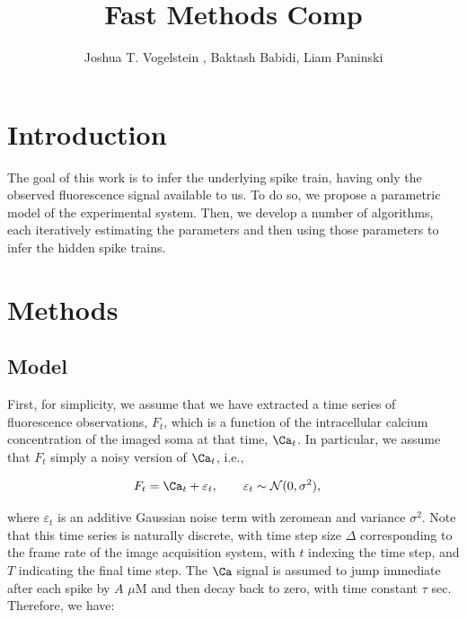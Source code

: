 \documentclass[12pt]{article}
\title{Fast Methods Comp}
\author{Joshua T. Vogelstein%
, Baktash Babidi, Liam Paninski
}
\begin{document}
\maketitle %
\tableofcontents

\begin{abstract}

\end{abstract}

\section{Introduction}

The goal of this work is to infer the underlying spike train, having only the observed fluorescence signal available to us.  To do so, we propose a parametric model of the experimental system.  Then, we develop a number of algorithms, each iteratively estimating the parameters and then using those parameters to infer the hidden spike trains.  

\section{Methods}
\subsection{Model}

First, for simplicity, we assume that we have extracted a time series of fluorescence observations, $F_t$, which is a function of the intracellular calcium concentration of the imaged soma at that time, $\Ca_t$.  In particular, we assume that $F_t$ simply a noisy version of $\Ca_t$, i.e.,

\begin{align} \label{eq:F}
F_t &=  \Ca_t + \varepsilon_t, \qquad \varepsilon_t \sim \mathcal{N}(0,\sigma^2),
\end{align}

\noindent where $\varepsilon_t$ is an additive Gaussian noise term with zeromean and variance $\sigma^2$. Note that this time series is naturally discrete, with time step size $\Delta$ corresponding to the frame rate of the image acquisition system, with $t$ indexing the time step, and $T$ indicating the final time step. The $\Ca$ signal is assumed to jump immediate after each spike by $A$ $\mu$M and then decay back to zero, with time constant $\tau$ sec.  Therefore, we have:
\end{document}
